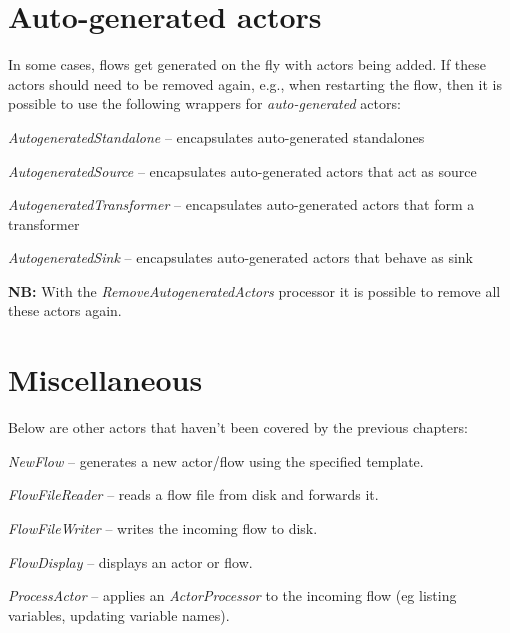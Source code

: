 \documentclass[a4paper]{book}
\begin{document}
\chapter{Auto-generated actors}
\label{autogeneratedactors}
In some cases, flows get generated on the fly with actors being added. If these
actors should need to be removed again, e.g., when restarting the flow, then
it is possible to use the following wrappers for \textit{auto-generated} actors:
\begin{tight_itemize}
	\item \textit{AutogeneratedStandalone} -- encapsulates auto-generated standalones
	\item \textit{AutogeneratedSource} -- encapsulates auto-generated actors that act as source
	\item \textit{AutogeneratedTransformer} -- encapsulates auto-generated actors that form a transformer
	\item \textit{AutogeneratedSink} -- encapsulates auto-generated actors that behave as sink
\end{tight_itemize}
\textbf{NB:} With the \textit{RemoveAutogeneratedActors} processor it is possible
to remove all these actors again.

\newpage
\chapter{Miscellaneous}
Below are other actors that haven't been covered by the previous chapters:
\begin{tight_itemize}
  \item \textit{NewFlow} -- generates a new actor/flow using the specified
  template.
  \item \textit{FlowFileReader} -- reads a flow file from disk and forwards it.
  \item \textit{FlowFileWriter} -- writes the incoming flow to disk.
  \item \textit{FlowDisplay} -- displays an actor or flow.
  \item \textit{ProcessActor} -- applies an \textit{ActorProcessor} to the
  incoming flow (eg listing variables, updating variable names).
\end{tight_itemize}


\end{document}
